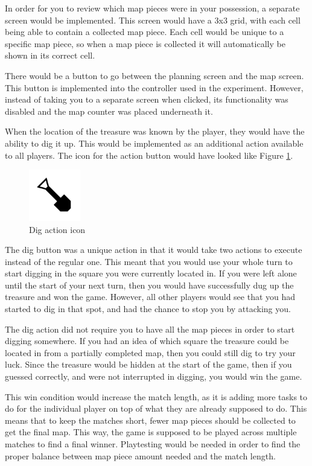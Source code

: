 In order for you to review which map pieces were in your possession, a separate screen would be implemented. This screen would have a 3x3 grid, with each cell being able to contain a collected map piece. Each cell would be unique to a specific map piece, so when a map piece is collected it will automatically be shown in its correct cell.

There would be a button to go between the planning screen and the map screen. This button is implemented into the controller used in the experiment. However, instead of taking you to a separate screen when clicked, its functionality was disabled and the map counter was placed underneath it.

When the location of the treasure was known by the player, they would have the ability to dig it up. This would be implemented as an additional action available to all players. The icon for the action button would have looked like Figure \ref{fig:dig}.

\begin{figure}[h!]
	\centering
	\includegraphics[width=0.2\textwidth]{figures/dig.png}
	\caption{Dig action icon \label{fig:dig}}
\end{figure}

The dig button was a unique action in that it would take two actions to execute instead of the regular one. This meant that you would use your whole turn to start digging in the square you were currently located in. If you were left alone until the start of your next turn, then you would have successfully dug up the treasure and won the game. However, all other players would see that you had started to dig in that spot, and had the chance to stop you by attacking you.

The dig action did not require you to have all the map pieces in order to start digging somewhere. If you had an idea of which square the treasure could be located in from a partially completed map, then you could still dig to try your luck. Since the treasure would be hidden at the start of the game, then if you guessed correctly, and were not interrupted in digging, you would win the game.

This win condition would increase the match length, as it is adding more tasks to do for the individual player on top of what they are already supposed to do. This means that to keep the matches short, fewer map pieces should be collected to get the final map. This way, the game is supposed to be played across multiple matches to find a final winner. Playtesting would be needed in order to find the proper balance between map piece amount needed and the match length.

